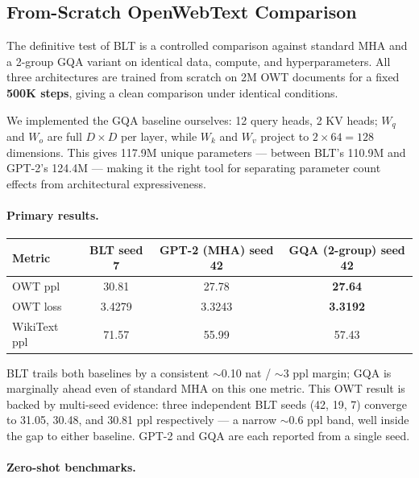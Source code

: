 \documentclass[11pt]{article}
\begin{document}
\subsection{From-Scratch OpenWebText Comparison}

The definitive test of BLT is a controlled comparison against standard MHA and a 2-group GQA variant on identical data, compute, and hyperparameters. All three architectures are trained from scratch on 2M OWT documents for a fixed \textbf{500K steps}, giving a clean comparison under identical conditions.

We implemented the GQA baseline ourselves: 12 query heads, 2 KV heads; $W_q$ and $W_o$ are full $D\times D$ per layer, while $W_k$ and $W_v$ project to $2\times 64=128$ dimensions. This gives 117.9M unique parameters --- between BLT's 110.9M and GPT-2's 124.4M --- making it the right tool for separating parameter count effects from architectural expressiveness.

\paragraph{Primary results.}

\begin{center}
\begin{tabular}{lccc}
\toprule
Metric & BLT seed 7 & GPT-2 (MHA) seed 42 & GQA (2-group) seed 42 \\
\midrule
OWT ppl & 30.81 & 27.78 & \textbf{27.64} \\
OWT loss & 3.4279 & 3.3243 & \textbf{3.3192} \\
WikiText ppl & 71.57 & 55.99 & 57.43 \\
\bottomrule
\end{tabular}
\end{center}

BLT trails both baselines by a consistent $\sim$0.10 nat / $\sim$3 ppl margin; GQA is marginally ahead even of standard MHA on this one metric. This OWT result is backed by multi-seed evidence: three independent BLT seeds (42, 19, 7) converge to 31.05, 30.48, and 30.81 ppl respectively --- a narrow $\sim$0.6 ppl band, well inside the gap to either baseline. GPT-2 and GQA are each reported from a single seed.

\paragraph{Zero-shot benchmarks.}
\end{document}
